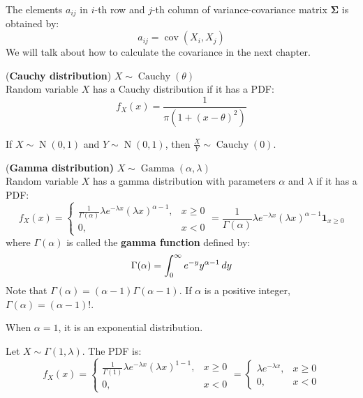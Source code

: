 \documentclass{huhtakm-template-book}
\DeclareMathOperator{\N}{N}
\DeclareMathOperator{\Cauchy}{Cauchy}
\DeclareMathOperator{\Gam}{Gamma}
\DeclareMathOperator{\cov}{cov}
\begin{document}
\begin{rem}
	The elements $a_{ij}$ in $i$-th row and $j$-th column of variance-covariance matrix $\mathbf{\Sigma}$ is obtained by:
	\begin{equation*}
		a_{ij}=\cov(X_{i},X_{j})
	\end{equation*} 
	We will talk about how to calculate the covariance in the next chapter.
\end{rem}
\begin{eg}(\textbf{Cauchy distribution}) $X\sim\Cauchy(\theta)$\\
	Random variable $X$ has a Cauchy distribution if it has a PDF:
	\begin{equation*}
		f_{X}(x)=\frac{1}{\pi(1+(x-\theta)^{2})}
	\end{equation*}
\end{eg}
\begin{rem}
	If $X\sim\N(0,1)$ and $Y\sim\N(0,1)$, then $\frac{X}{Y}\sim\Cauchy(0)$.
\end{rem}
\begin{eg}(\textbf{Gamma distribution)} $X\sim\Gam(\alpha,\lambda)$\\
	Random variable $X$ has a gamma distribution with parameters $\alpha$ and $\lambda$ if it has a PDF:
	\begin{equation*}
		f_{X}(x)=\begin{cases}
			\frac{1}{\Gamma(\alpha)}\lambda e^{-\lambda x}(\lambda x)^{\alpha-1}, &x\geq 0\\
			0, &x<0
		\end{cases}=\frac{1}{\Gamma(\alpha)}\lambda e^{-\lambda x}(\lambda x)^{\alpha-1}\mathbf{1}_{x\geq 0}
	\end{equation*}
	where $\Gamma(\alpha)$ is called the \textbf{gamma function} defined by:
	\begin{equation*}
		\Gamma(\alpha)=\int_{0}^{\infty}e^{-y}y^{\alpha-1}\,dy
	\end{equation*}
	Note that $\Gamma(\alpha)=(\alpha-1)\Gamma(\alpha-1)$. If $\alpha$ is a positive integer, $\Gamma(\alpha)=(\alpha-1)!$.
\end{eg}
\begin{lem}
	When $\alpha=1$, it is an exponential distribution.
\end{lem}
\begin{proofing}
	Let $X\sim\Gamma(1,\lambda)$. The PDF is:
	\begin{equation*}
		f_{X}(x)=\begin{cases}
			\frac{1}{\Gamma(1)}\lambda e^{-\lambda x}(\lambda x)^{1-1}, &x\geq 0\\
			0, &x<0
		\end{cases}=\begin{cases}
			\lambda e^{-\lambda x}, &x\geq 0\\
			0, &x<0
		\end{cases}
	\end{equation*}
\end{proofing}
\end{document}
